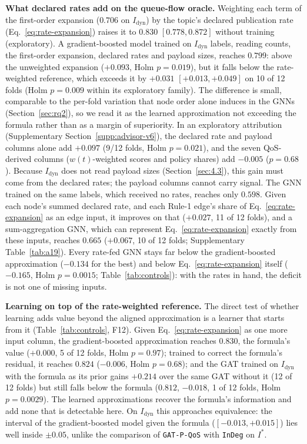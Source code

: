 \documentclass[preprint,3p]{elsarticle}
\begin{document}
\noindent\textbf{What declared rates add on the queue-flow oracle.} Weighting each term of the first-order expansion ($0.706$ on $I_{\text{dyn}}$) by the topic's declared publication rate (Eq.~\eqref{eq:rate-expansion}) raises it to $0.830$ $[0.778, 0.872]$ without training (exploratory). A gradient-boosted model trained on $I_{\text{dyn}}$ labels, reading counts, the first-order expansion, declared rates and payload sizes, reaches $0.799$: above the unweighted expansion ($+0.093$, Holm $p = 0.019$), but it falls below the rate-weighted reference, which exceeds it by $+0.031$ $[+0.013, +0.049]$ on 10 of 12 folds (Holm $p = 0.009$ within its exploratory family). The difference is small, comparable to the per-fold variation that node order alone induces in the GNNs (Section~\ref{sec:rq2}), so we read it as the learned approximation not exceeding the formula rather than as a margin of superiority. In an exploratory attribution (Supplementary Section~\ref{supp:advisor-v6}), the declared rate and payload columns alone add $+0.097$ (9/12 folds, Holm $p = 0.021$), and the seven QoS-derived columns ($w(t)$-weighted scores and policy shares) add $-0.005$ ($p = 0.68$). Because $I_{\text{dyn}}$ does not read payload sizes (Section~\ref{sec:4.3}), this gain must come from the declared rates; the payload columns cannot carry signal. The GNN trained on the same labels, which received no rates, reaches only $0.598$. Given each node's summed declared rate, and each Rule-1 edge's share of Eq.~\eqref{eq:rate-expansion} as an edge input, it improves on that ($+0.027$, 11 of 12 folds), and a sum-aggregation GNN, which can represent Eq.~\eqref{eq:rate-expansion} exactly from these inputs, reaches $0.665$ ($+0.067$, 10 of 12 folds; Supplementary Table~\ref{tab:a19}). Every rate-fed GNN stays far below the gradient-boosted approximation ($-0.134$ for the best) and below Eq.~\eqref{eq:rate-expansion} itself ($-0.165$, Holm $p = 0.0015$; Table~\ref{tab:controls}): with the rates in hand, the deficit is not one of missing inputs.

\noindent\textbf{Learning on top of the rate-weighted reference.} The direct test of whether learning adds value beyond the aligned approximation is a learner that starts from it (Table~\ref{tab:controls}, F12). Given Eq.~\eqref{eq:rate-expansion} as one more input column, the gradient-boosted approximation reaches $0.830$, the formula's value ($+0.000$, 5 of 12 folds, Holm $p = 0.97$); trained to correct the formula's residual, it reaches $0.824$ ($-0.006$, Holm $p = 0.68$); and the GAT trained on $I_{\text{dyn}}$ with the formula as its prior gains $+0.214$ over the same GAT without it (12 of 12 folds) but still falls below the formula ($0.812$, $-0.018$, 1 of 12 folds, Holm $p = 0.0029$). The learned approximations recover the formula's information and add none that is detectable here. On $I_{\text{dyn}}$ this approaches equivalence: the interval of the gradient-boosted model given the formula ($[-0.013, +0.015]$) lies well inside $\pm 0.05$, unlike the comparison of \texttt{GAT-P-QoS} with \texttt{InDeg} on $I^*$.
\end{document}
